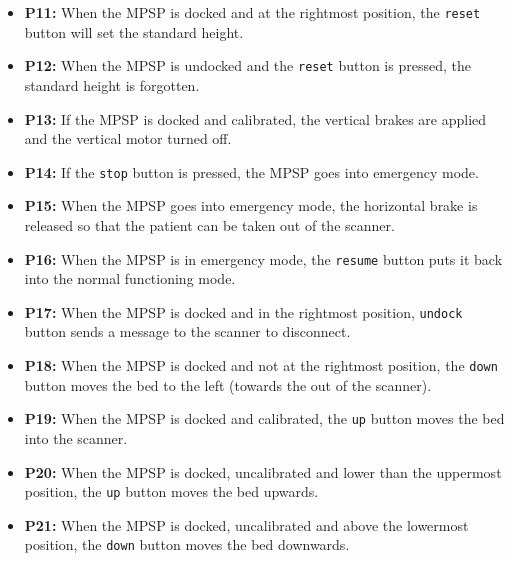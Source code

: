 \begin{itemize}
    \item \textbf{P11:}  When the MPSP is docked and at the rightmost position, the \verb$reset$ button will set the standard height. \\
    \item \textbf{P12:} When the MPSP is undocked and the \verb$reset$ button is pressed, the standard height is forgotten.\\
    \item \textbf{P13:} If the MPSP is docked and calibrated, the vertical brakes are applied and the vertical motor turned off. \\
    \item \textbf{P14:} If the \verb$stop$ button is pressed, the MPSP goes into emergency mode. \\
    \item \textbf{P15:} When the MPSP goes into emergency mode, the horizontal brake is released so that the patient can be taken out of the scanner. \\
    \item \textbf{P16:} When the MPSP is in emergency mode, the \verb$resume$ button puts it back into the normal functioning mode.  \\
    \item \textbf{P17:} When the MPSP is docked and in the rightmost position, \verb$undock$ button sends a message to the scanner to disconnect.\\
    \item \textbf{P18:}  When the MPSP is docked and not at the rightmost position, the \verb$down$ button moves the bed to the left (towards the out of the scanner). \\
    \item \textbf{P19:} When the MPSP is docked and calibrated, the \verb $up$ button moves the bed into the scanner. \\
    \item \textbf{P20:} When the MPSP is docked, uncalibrated and lower than the uppermost position, the \verb$up$ button moves the bed upwards. \\
    \item \textbf{P21:} When the MPSP is docked, uncalibrated and above the lowermost position, the \verb$down$ button moves the bed downwards. \\

     
\end{itemize}